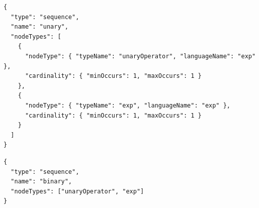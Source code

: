 \documentclass[]{report}
\begin{document}
\begin{listing}[p]
\begin{verbatim}
{
  "type": "sequence",
  "name": "unary",
  "nodeTypes": [
    {
      "nodeType": { "typeName": "unaryOperator", "languageName": "exp" },
      "cardinality": { "minOccurs": 1, "maxOccurs": 1 }
    },
    {
      "nodeType": { "typeName": "exp", "languageName": "exp" },
      "cardinality": { "minOccurs": 1, "maxOccurs": 1 }
    }
  ]
}
\end{verbatim}
\caption{Example of children specification without any improvements for readability}
\label{lst:grammar-children-no-shorthand}
\end{listing}

\begin{listing}[p]
\begin{verbatim}
{
  "type": "sequence",
  "name": "binary",
  "nodeTypes": ["unaryOperator", "exp"]
}
\end{verbatim}
\caption{Example of children specification with implicit \texttt{languageName} and 1 cardinality}
\label{lst:grammar-children-shorthand}
\end{listing}
\end{document}

